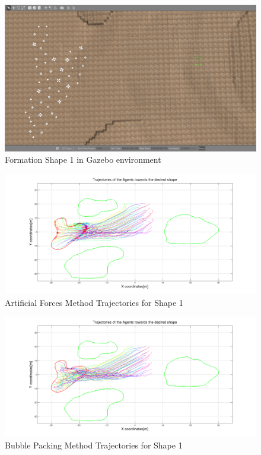 \begin{figure}[H]
\caption{Formation Shape 1 in Gazebo environment}
\centerline{\includegraphics[scale = 0.32]{Trajectories_Formation_Shape_1_1}}
\end{figure} 	
		
\begin{figure}[H]
\caption{Artificial Forces Method Trajectories for Shape 1}
\centerline{\includegraphics[scale = 0.32]{Aritificial_Trajecories_1}}
\end{figure} 	

\begin{figure}[H]
\caption{Bubble Packing Method Trajectories for Shape 1}
\centerline{\includegraphics[scale = 0.32]{Bubble_Trajectories_1}}
\end{figure} 	
		
